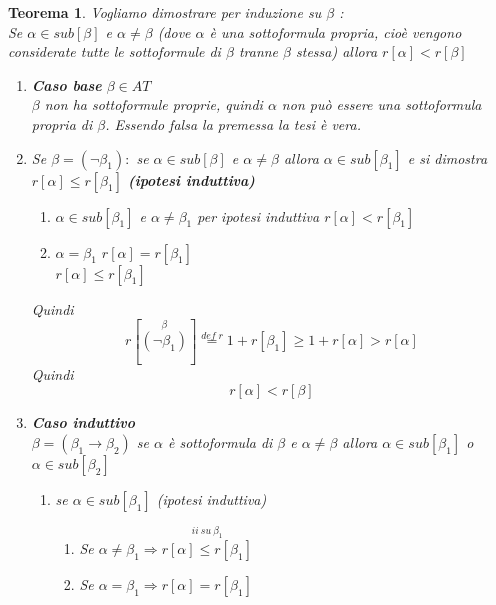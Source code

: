 \documentclass{article}
\newtheorem{theorem}{Teorema}
\theoremstyle{break}
\theoremstyle{break}
\theoremstyle{break}
\theoremstyle{break}
\begin{document}
\begin{theorem}
  Vogliamo dimostrare per induzione su \( \beta \) :\\
  Se \( \alpha \in sub[\beta] \) e \( \alpha \neq \beta \) (dove \( \alpha \)
  è una sottoformula propria, cioè vengono considerate tutte le sottoformule
  di \( \beta \) tranne \( \beta \) stessa)
  allora \( r[\alpha] < r[\beta] \)
  \begin{enumerate}
    \item \textbf{Caso base} \( \beta \in AT \)\\
      \( \beta \) non ha sottoformule proprie, quindi \( \alpha \)
      non può essere una sottoformula propria di \( \beta \).
      Essendo falsa la premessa la tesi è vera.
    \item Se \( \beta=(\neg \beta_1): \) se \( \alpha \in sub[\beta] \) e
      \( \alpha \neq \beta \)
      allora \( \alpha \in  sub[\beta_1] \)  e si dimostra
      \( r[\alpha] \le r[\beta_1] \) \textbf{(ipotesi induttiva)}
      \begin{enumerate}
        \item \( \alpha \in sub[\beta_1] \) e \( \alpha \neq \beta_1 \)
          per ipotesi induttiva \( r[\alpha] < r[\beta_1] \)
        \item \( \alpha = \beta_1 \) \( r[\alpha] = r[\beta_1] \)\\
          \( r[\alpha] \le r[\beta_1] \)
      \end{enumerate}
      Quindi
      \[
        r[\stackrel{\beta}{(\neg \beta_1)}] \stackrel{def\; r}{=} 1 + r[\beta_1]\ge 1+r[\alpha]>r[\alpha]
      \]
      Quindi
      \[
        r[\alpha] < r[\beta]
      \]
    \item \textbf{Caso induttivo}\\
      \( \beta = (\beta_1 \to \beta_2) \) se \( \alpha \)  è
      sottoformula di \( \beta \) e \( \alpha \neq \beta \)
      allora \( \alpha \in sub[\beta_1] \) o \( \alpha \in sub[\beta_2]\)
      \begin{enumerate}
        \item se \( \alpha \in sub[\beta_1] \) (ipotesi induttiva)
          \begin{enumerate}
            \item \label{sub3a1} Se \( \alpha \neq \beta_1 \Rightarrow
              \stackrel{ii\: su\: \beta_1 }{r[\alpha] \le r[\beta_1]} \)
            \item \label{sub3a2} Se \( \alpha = \beta_1 \Rightarrow r[\alpha] = r[\beta_1]\)
          \end{enumerate}

\end{enumerate}
\end{enumerate}
\end{theorem}
\end{document}
